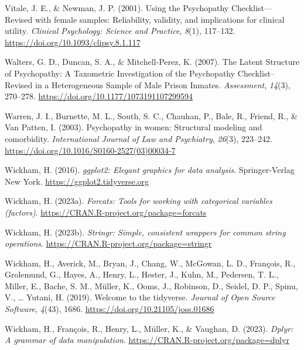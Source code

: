 \documentclass[
  man,floatsintext]{apa7}
\newlength{\cslhangindent}
\newlength{\cslentryspacingunit} %
\newenvironment{CSLReferences}[2] %
 {%
  \setlength{\parindent}{0pt}
  \ifodd #1
  \let\oldpar\par
  \def\par{\hangindent=\cslhangindent\oldpar}
  \fi
  \setlength{\parskip}{#2\cslentryspacingunit}
 }%
 {}
\begin{document}
\begin{CSLReferences}{1}{0}
\leavevmode{}%
Vitale, J. E., \& Newman, J. P. (2001). Using the {Psychopathy Checklist}---{Revised} with female samples: {Reliability}, validity, and implications for clinical utility. \emph{Clinical Psychology: Science and Practice}, \emph{8}(1), 117--132. \url{https://doi.org/10.1093/clipsy.8.1.117}

\leavevmode{}%
Walters, G. D., Duncan, S. A., \& Mitchell-Perez, K. (2007). The {Latent Structure} of {Psychopathy}: {A Taxometric Investigation} of the {Psychopathy Checklist}--{Revised} in a {Heterogeneous Sample} of {Male Prison Inmates}. \emph{Assessment}, \emph{14}(3), 270--278. \url{https://doi.org/10.1177/1073191107299594}

\leavevmode{}%
Warren, J. I., Burnette, M. L., South, S. C., Chauhan, P., Bale, R., Friend, R., \& Van Patten, I. (2003). Psychopathy in women: {Structural} modeling and comorbidity. \emph{International Journal of Law and Psychiatry}, \emph{26}(3), 223--242. \url{https://doi.org/10.1016/S0160-2527(03)00034-7}

\leavevmode{}%
Wickham, H. (2016). \emph{ggplot2: Elegant graphics for data analysis}. Springer-Verlag New York. \url{https://ggplot2.tidyverse.org}

\leavevmode{}%
Wickham, H. (2023a). \emph{Forcats: Tools for working with categorical variables (factors)}. \url{https://CRAN.R-project.org/package=forcats}

\leavevmode{}%
Wickham, H. (2023b). \emph{Stringr: Simple, consistent wrappers for common string operations}. \url{https://CRAN.R-project.org/package=stringr}

\leavevmode{}%
Wickham, H., Averick, M., Bryan, J., Chang, W., McGowan, L. D., François, R., Grolemund, G., Hayes, A., Henry, L., Hester, J., Kuhn, M., Pedersen, T. L., Miller, E., Bache, S. M., Müller, K., Ooms, J., Robinson, D., Seidel, D. P., Spinu, V., \ldots{} Yutani, H. (2019). Welcome to the {tidyverse}. \emph{Journal of Open Source Software}, \emph{4}(43), 1686. \url{https://doi.org/10.21105/joss.01686}

\leavevmode{}%
Wickham, H., François, R., Henry, L., Müller, K., \& Vaughan, D. (2023). \emph{Dplyr: A grammar of data manipulation}. \url{https://CRAN.R-project.org/package=dplyr}


\end{CSLReferences}
\end{document}
